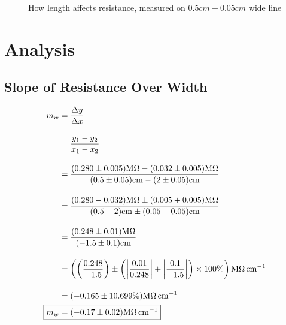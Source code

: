\documentclass[12pt]{article}
\begin{document}
\begin{figure}[H]
    \centering
    \caption{How length affects resistance, measured on $0.5\si{cm} \pm 0.05\si{cm}$ wide line}
    \label{plot:length}
\end{figure}

\section{Analysis}

\subsection{Slope of Resistance Over Width}

\begin{align*}
    m_w &= \frac{\Delta y}{\Delta x} \\[10pt]
    &= \frac{y_1 - y_2}{x_1 - x_2} \\[10pt]
    &= \frac{(0.280 \pm 0.005)\si{\mega\ohm} - (0.032 \pm 0.005)\si{\mega\ohm}}{(0.5 \pm 0.05)\si{cm} - (2 \pm 0.05)\si{cm}} \\[10pt]
    &= \frac{(0.280 - 0.032)\si{\mega\ohm} \pm (0.005 + 0.005)\si{\mega\ohm}}{(0.5 - 2)\si{cm} \pm (0.05 - 0.05)\si{cm}} \\[10pt]
    &= \frac{(0.248 \pm 0.01)\si{\mega\ohm}}{(-1.5 \pm 0.1)\si{cm}} \\[10pt]
    &= \left( \left( \frac{0.248}{-1.5} \right) \pm \left( \left| \frac{0.01}{0.248} \right| + \left| \frac{0.1}{-1.5} \right| \right) \times 100\% \right) \si{\mega\ohm\per\cm} \\[10pt]
    &= (-0.165 \pm 10.699\%) \si{\mega\ohm\per\cm} \\
    \Aboxed{m_w &= (-0.17 \pm 0.02) \si{\mega\ohm\per\cm}}
\end{align*}
\end{document}

